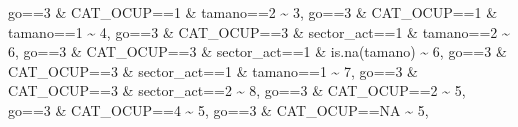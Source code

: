 \documentclass[
]{book}
\newenvironment{Shaded}{\begin{snugshade}}{\end{snugshade}}
\newcommand{\ConstantTok}[1]{\textcolor[rgb]{0.00,0.00,0.00}{#1}}
\newcommand{\DecValTok}[1]{\textcolor[rgb]{0.00,0.00,0.81}{#1}}
\newcommand{\FunctionTok}[1]{\textcolor[rgb]{0.00,0.00,0.00}{#1}}
\newcommand{\NormalTok}[1]{#1}
\newcommand{\SpecialCharTok}[1]{\textcolor[rgb]{0.00,0.00,0.00}{#1}}
\begin{document}
\begin{Shaded}
\begin{Highlighting}[]
\NormalTok{                               go}\SpecialCharTok{==}\DecValTok{3} \SpecialCharTok{\&}\NormalTok{ CAT\_OCUP}\SpecialCharTok{==}\DecValTok{1} \SpecialCharTok{\&}\NormalTok{ tamano}\SpecialCharTok{==}\DecValTok{2} \SpecialCharTok{\textasciitilde{}} \DecValTok{3}\NormalTok{,}
\NormalTok{                               go}\SpecialCharTok{==}\DecValTok{3} \SpecialCharTok{\&}\NormalTok{ CAT\_OCUP}\SpecialCharTok{==}\DecValTok{1} \SpecialCharTok{\&}\NormalTok{ tamano}\SpecialCharTok{==}\DecValTok{1} \SpecialCharTok{\textasciitilde{}} \DecValTok{4}\NormalTok{,}
\NormalTok{                               go}\SpecialCharTok{==}\DecValTok{3} \SpecialCharTok{\&}\NormalTok{ CAT\_OCUP}\SpecialCharTok{==}\DecValTok{3} \SpecialCharTok{\&}\NormalTok{ sector\_act}\SpecialCharTok{==}\DecValTok{1} \SpecialCharTok{\&}\NormalTok{ tamano}\SpecialCharTok{==}\DecValTok{2} \SpecialCharTok{\textasciitilde{}} \DecValTok{6}\NormalTok{,}
\NormalTok{                               go}\SpecialCharTok{==}\DecValTok{3} \SpecialCharTok{\&}\NormalTok{ CAT\_OCUP}\SpecialCharTok{==}\DecValTok{3} \SpecialCharTok{\&}\NormalTok{ sector\_act}\SpecialCharTok{==}\DecValTok{1} \SpecialCharTok{\&} \FunctionTok{is.na}\NormalTok{(tamano) }\SpecialCharTok{\textasciitilde{}} \DecValTok{6}\NormalTok{,}
\NormalTok{                               go}\SpecialCharTok{==}\DecValTok{3} \SpecialCharTok{\&}\NormalTok{ CAT\_OCUP}\SpecialCharTok{==}\DecValTok{3} \SpecialCharTok{\&}\NormalTok{ sector\_act}\SpecialCharTok{==}\DecValTok{1} \SpecialCharTok{\&}\NormalTok{ tamano}\SpecialCharTok{==}\DecValTok{1}  \SpecialCharTok{\textasciitilde{}} \DecValTok{7}\NormalTok{,}
\NormalTok{                               go}\SpecialCharTok{==}\DecValTok{3} \SpecialCharTok{\&}\NormalTok{ CAT\_OCUP}\SpecialCharTok{==}\DecValTok{3} \SpecialCharTok{\&}\NormalTok{ sector\_act}\SpecialCharTok{==}\DecValTok{2} \SpecialCharTok{\textasciitilde{}} \DecValTok{8}\NormalTok{,}
\NormalTok{                               go}\SpecialCharTok{==}\DecValTok{3} \SpecialCharTok{\&}\NormalTok{ CAT\_OCUP}\SpecialCharTok{==}\DecValTok{2} \SpecialCharTok{\textasciitilde{}} \DecValTok{5}\NormalTok{,}
\NormalTok{                               go}\SpecialCharTok{==}\DecValTok{3} \SpecialCharTok{\&}\NormalTok{ CAT\_OCUP}\SpecialCharTok{==}\DecValTok{4} \SpecialCharTok{\textasciitilde{}} \DecValTok{5}\NormalTok{,}
\NormalTok{                               go}\SpecialCharTok{==}\DecValTok{3} \SpecialCharTok{\&}\NormalTok{ CAT\_OCUP}\SpecialCharTok{==}\ConstantTok{NA} \SpecialCharTok{\textasciitilde{}} \DecValTok{5}\NormalTok{,}
         

\end{Highlighting}
\end{Shaded}
\end{document}
